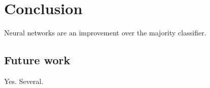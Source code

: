 \chapter{Conclusion}

Neural networks are an improvement over the majority classifier.


\section{Future work}

Yes. Several.
